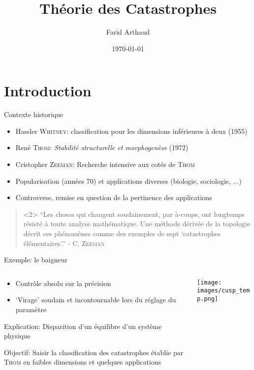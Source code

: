 \documentclass[compress]{beamer}
\author{Farid Arthaud}
\title{Théorie des Catastrophes}
\date{\today}
\theoremstyle{definition}
\begin{document}
\section*{Introduction}

\frame{\titlepage}

\frame{\tableofcontents}

\begin{frame}{Contexte historique}
    \begin{itemize}
        \item Hassler \textsc{Whitney}: classification pour les dimensions inférieures à deux (1955)
        \item René \textsc{Thom}: \textit{Stabilité structurelle et morphogenèse} (1972)
        \item Cristopher \textsc{Zeeman}: Recherche intensive aux cotés de \textsc{Thom}
        \item Popularisation (années 70) et applications diverses (biologie, sociologie, ...)
        \item Controverse, remise en question de la pertinence des applications
    \end{itemize}
    \begin{quote}<2>
        ``Les choses qui changent soudainement, par à-coups, ont longtemps résisté à toute analyse mathématique.
        Une méthode dérivée de la topologie décrit ces phénomènes comme des exemples de sept `catastrophes élémentaires'.'' - C. \textsc{Zeeman}
    \end{quote}
\end{frame}

\begin{frame}{Exemple: le baigneur}
    \begin{columns}[T]
        \begin{column}{5cm}
            \begin{itemize}[<+->]
                \item Contrôle absolu sur la précision
                \item `Virage' soudain et incontournable lors du réglage du paramètre
            \end{itemize}

            \pause[3]
            \alert{Explication}: Disparition d'un équilibre d'un système physique

            \pause
            \alert{Objectif}: Saisir la classification des catastrophes établie par \textsc{Thom} en faibles dimensions et quelques applications
        \end{column}
        \begin{column}{5cm}
            \texttt{[image: images/cusp\_temp.png]}
        \end{column}
    \end{columns}
\end{frame}
\end{document}
